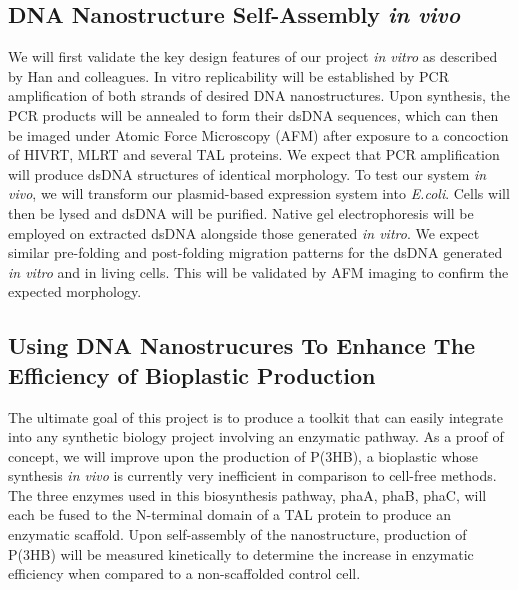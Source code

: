 \documentclass[a4paper]{article}
\begin{document}
\subsection*{DNA Nanostructure Self-Assembly \textit{in vivo}}
We will first validate the key design features of our project \textit{in vitro} as described by Han and colleagues\cite{meth3}.
In vitro replicability will be established by PCR amplification of both strands of desired DNA nanostructures.
Upon synthesis, the PCR products will be annealed to form their dsDNA sequences, which can then be imaged under Atomic Force Microscopy (AFM) after exposure to a concoction of HIVRT, MLRT and several TAL proteins.
We expect that PCR amplification will produce dsDNA structures of identical morphology.
To test our system \textit{in vivo}, we will transform our plasmid-based expression system into \textit{E.coli}.
Cells will then be lysed and dsDNA will be purified.
Native gel electrophoresis will be employed on extracted dsDNA alongside those generated \textit{in vitro}.
We expect similar pre-folding and post-folding migration patterns for the dsDNA generated \textit{in vitro} and in living cells.
This will be validated by AFM imaging to confirm the expected morphology.
\subsection*{Using DNA Nanostrucures To Enhance The Efficiency of Bioplastic Production}
The ultimate goal of this project is to produce a toolkit that can easily integrate into any synthetic biology project involving an enzymatic pathway.
As a proof of concept, we will improve upon the production of P(3HB), a bioplastic whose synthesis \textit{in vivo} is currently very inefficient in comparison to cell-free methods\cite{plastic}.
The three enzymes used in this biosynthesis pathway, phaA, phaB, phaC, will each be fused to the N-terminal domain of a TAL protein to produce an enzymatic scaffold\cite{plastprod}.
Upon self-assembly of the nanostructure, production of P(3HB) will be measured kinetically to determine the increase in enzymatic efficiency when compared to a non-scaffolded control cell.
\end{document}
